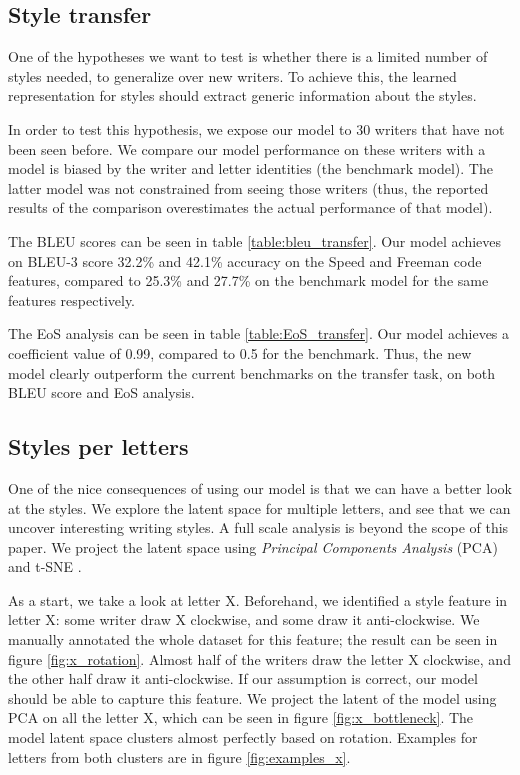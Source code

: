 \documentclass[conference]{IEEEtran}
\begin{document}
\subsection{Style transfer}
\par One of the hypotheses we want to test is whether there is a limited number of styles needed, to generalize over new writers. To achieve this, the learned representation for styles should extract generic information about the styles. 

\par In order to test this hypothesis, we expose our model to 30 writers that have not been seen before. We compare our model performance on these writers with a model is biased by the writer and letter identities (the benchmark model). The latter model was not constrained from seeing those writers (thus, the reported results of the comparison overestimates the actual performance of that model). 

\par The BLEU scores can be seen in table \ref{table:bleu_transfer}. Our model achieves on BLEU-3 score 32.2\% and 42.1\% accuracy on the Speed and Freeman code features, compared to 25.3\% and 27.7\% on the benchmark model for the same features respectively. 
\par The EoS analysis can be seen in table \ref{table:EoS_transfer}. Our model achieves a coefficient value of 0.99, compared to 0.5 for the benchmark.
Thus, the new model clearly outperform the current benchmarks on the transfer task, on both BLEU score and EoS analysis.

\subsection{Styles per letters}
\par One of the nice consequences of using our model is that we can have a better look at the styles. We explore the latent space for multiple letters, and see that we can uncover interesting writing styles. A full scale analysis is beyond the scope of this paper. We project the latent space using \textit{Principal Components Analysis} (PCA) \cite{jolliffe2011principal} and t-SNE \cite{maaten2008visualizing}.

\par As a start, we take a look at letter X. Beforehand, we identified a style feature in letter X: some writer draw X clockwise, and some draw it anti-clockwise. We manually annotated the whole dataset for this feature; the result can be seen in figure \ref{fig:x_rotation}. Almost half of the writers draw the letter X clockwise, and the other half draw it anti-clockwise. If our assumption is correct, our model should be able to capture this feature. We project the latent  of the model using PCA on all the letter X, which can be seen in figure \ref{fig:x_bottleneck}. The model latent space clusters almost perfectly based on rotation. Examples for letters from both clusters are in figure \ref{fig:examples_x}. 
\end{document}
